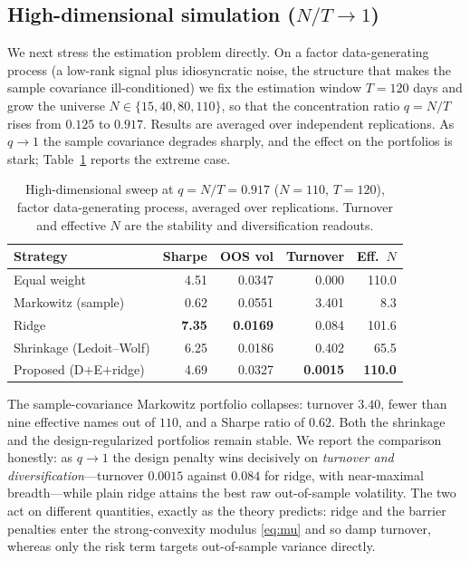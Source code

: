 \subsection{High-dimensional simulation ($N/T\to1$)}
\label{sec:highdim}
We next stress the estimation problem directly. On a factor data-generating
process (a low-rank signal plus idiosyncratic noise, the structure that makes the
sample covariance ill-conditioned) we fix the estimation window $T=120$ days and
grow the universe $N\in\{15,40,80,110\}$, so that the concentration ratio
$q=N/T$ rises from $0.125$ to $0.917$. Results are averaged over independent
replications. As $q\to1$ the sample covariance degrades sharply, and the effect
on the portfolios is stark; Table~\ref{tab:nt} reports the extreme case.

\begin{table}[htbp]
\centering
\caption{High-dimensional sweep at $q=N/T=0.917$ ($N=110$, $T=120$), factor
  data-generating process, averaged over replications. Turnover and effective
  $N$ are the stability and diversification readouts.}
\label{tab:nt}
\begin{tabular}{lrrrr}
\toprule
\textbf{Strategy} & \textbf{Sharpe} & \textbf{OOS vol} & \textbf{Turnover} & \textbf{Eff.\ $N$} \\
\midrule
Equal weight              & 4.51 & 0.0347 & 0.000 & 110.0 \\
Markowitz (sample)        & 0.62 & 0.0551 & 3.401 & 8.3 \\
Ridge                     & \textbf{7.35} & \textbf{0.0169} & 0.084 & 101.6 \\
Shrinkage (Ledoit--Wolf)  & 6.25 & 0.0186 & 0.402 & 65.5 \\
Proposed (D$+$E$+$ridge)  & 4.69 & 0.0327 & \textbf{0.0015} & \textbf{110.0} \\
\bottomrule
\end{tabular}
\end{table}

The sample-covariance Markowitz portfolio collapses: turnover $3.40$, fewer than
nine effective names out of $110$, and a Sharpe ratio of $0.62$. Both the
shrinkage and the design-regularized portfolios remain stable. We report the
comparison honestly: as $q\to1$ the design penalty wins decisively on
\emph{turnover and diversification}---turnover $0.0015$ against $0.084$ for
ridge, with near-maximal breadth---while plain ridge attains the best raw
out-of-sample volatility. The two act on different quantities, exactly as the
theory predicts: ridge and the barrier penalties enter the strong-convexity
modulus \eqref{eq:mu} and so damp turnover, whereas only the risk term targets
out-of-sample variance directly.

